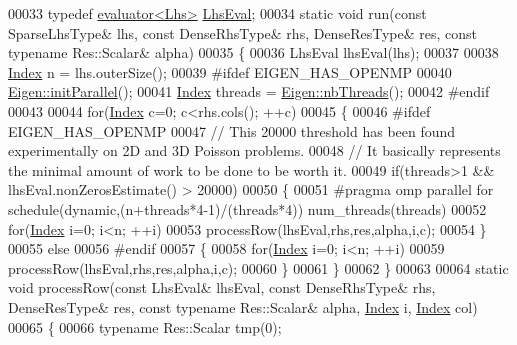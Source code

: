 \begin{DoxyCode}
00033   \textcolor{keyword}{typedef} \hyperlink{struct_eigen_1_1internal_1_1evaluator}{evaluator<Lhs>} \hyperlink{struct_eigen_1_1internal_1_1evaluator}{LhsEval};
00034   \textcolor{keyword}{static} \textcolor{keywordtype}{void} run(\textcolor{keyword}{const} SparseLhsType& lhs, \textcolor{keyword}{const} DenseRhsType& rhs, DenseResType& res, \textcolor{keyword}{const} \textcolor{keyword}{typename} 
      Res::Scalar& alpha)
00035   \{
00036     LhsEval lhsEval(lhs);
00037     
00038     \hyperlink{namespace_eigen_a62e77e0933482dafde8fe197d9a2cfde}{Index} n = lhs.outerSize();
00039 \textcolor{preprocessor}{#ifdef EIGEN\_HAS\_OPENMP}
00040     \hyperlink{namespace_eigen_a820c0e0460934cc17eb6dacbad54a9f5}{Eigen::initParallel}();
00041     \hyperlink{namespace_eigen_a62e77e0933482dafde8fe197d9a2cfde}{Index} threads = \hyperlink{namespace_eigen_a9aca97d83e21b91a04ec079360dfffeb}{Eigen::nbThreads}();
00042 \textcolor{preprocessor}{#endif}
00043     
00044     \textcolor{keywordflow}{for}(\hyperlink{namespace_eigen_a62e77e0933482dafde8fe197d9a2cfde}{Index} c=0; c<rhs.cols(); ++c)
00045     \{
00046 \textcolor{preprocessor}{#ifdef EIGEN\_HAS\_OPENMP}
00047       \textcolor{comment}{// This 20000 threshold has been found experimentally on 2D and 3D Poisson problems.}
00048       \textcolor{comment}{// It basically represents the minimal amount of work to be done to be worth it.}
00049       \textcolor{keywordflow}{if}(threads>1 && lhsEval.nonZerosEstimate() > 20000)
00050       \{
00051 \textcolor{preprocessor}{        #pragma omp parallel for schedule(dynamic,(n+threads*4-1)/(threads*4)) num\_threads(threads)}
00052         \textcolor{keywordflow}{for}(\hyperlink{namespace_eigen_a62e77e0933482dafde8fe197d9a2cfde}{Index} i=0; i<n; ++i)
00053           processRow(lhsEval,rhs,res,alpha,i,c);
00054       \}
00055       \textcolor{keywordflow}{else}
00056 \textcolor{preprocessor}{#endif}
00057       \{
00058         \textcolor{keywordflow}{for}(\hyperlink{namespace_eigen_a62e77e0933482dafde8fe197d9a2cfde}{Index} i=0; i<n; ++i)
00059           processRow(lhsEval,rhs,res,alpha,i,c);
00060       \}
00061     \}
00062   \}
00063   
00064   \textcolor{keyword}{static} \textcolor{keywordtype}{void} processRow(\textcolor{keyword}{const} LhsEval& lhsEval, \textcolor{keyword}{const} DenseRhsType& rhs, DenseResType& res, \textcolor{keyword}{const} \textcolor{keyword}{typename}
       Res::Scalar& alpha, \hyperlink{namespace_eigen_a62e77e0933482dafde8fe197d9a2cfde}{Index} i, \hyperlink{namespace_eigen_a62e77e0933482dafde8fe197d9a2cfde}{Index} col)
00065   \{
00066     \textcolor{keyword}{typename} Res::Scalar tmp(0);

\end{DoxyCode}
